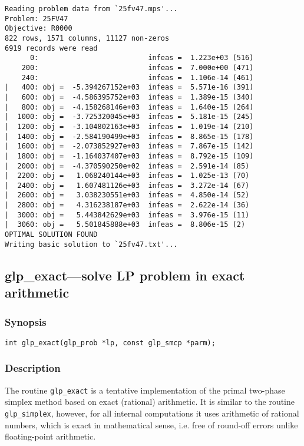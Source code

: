 \begin{footnotesize}
\begin{verbatim}
Reading problem data from `25fv47.mps'...
Problem: 25FV47
Objective: R0000
822 rows, 1571 columns, 11127 non-zeros
6919 records were read
      0:                          infeas =  1.223e+03 (516)
    200:                          infeas =  7.000e+00 (471)
    240:                          infeas =  1.106e-14 (461)
|   400: obj =  -5.394267152e+03  infeas =  5.571e-16 (391)
|   600: obj =  -4.586395752e+03  infeas =  1.389e-15 (340)
|   800: obj =  -4.158268146e+03  infeas =  1.640e-15 (264)
|  1000: obj =  -3.725320045e+03  infeas =  5.181e-15 (245)
|  1200: obj =  -3.104802163e+03  infeas =  1.019e-14 (210)
|  1400: obj =  -2.584190499e+03  infeas =  8.865e-15 (178)
|  1600: obj =  -2.073852927e+03  infeas =  7.867e-15 (142)
|  1800: obj =  -1.164037407e+03  infeas =  8.792e-15 (109)
|  2000: obj =  -4.370590250e+02  infeas =  2.591e-14 (85)
|  2200: obj =   1.068240144e+03  infeas =  1.025e-13 (70)
|  2400: obj =   1.607481126e+03  infeas =  3.272e-14 (67)
|  2600: obj =   3.038230551e+03  infeas =  4.850e-14 (52)
|  2800: obj =   4.316238187e+03  infeas =  2.622e-14 (36)
|  3000: obj =   5.443842629e+03  infeas =  3.976e-15 (11)
|  3060: obj =   5.501845888e+03  infeas =  8.806e-15 (2)
OPTIMAL SOLUTION FOUND
Writing basic solution to `25fv47.txt'...
\end{verbatim}
\end{footnotesize}

\subsection{glp\_exact---solve LP problem in exact arithmetic}

\subsubsection*{Synopsis}

\begin{verbatim}
int glp_exact(glp_prob *lp, const glp_smcp *parm);
\end{verbatim}

\subsubsection*{Description}

The routine \verb|glp_exact| is a tentative implementation of the
primal two-phase simplex method based on exact (rational) arithmetic.
It is similar to the routine \verb|glp_simplex|, however, for all
internal computations it uses arithmetic of rational numbers, which is
exact in mathematical sense, i.e. free of round-off errors unlike
floating-point arithmetic.

